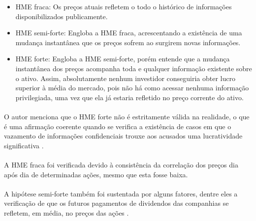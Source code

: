 \begin{itemize}
    \item HME fraca: Os preços atuais refletem o todo o histórico de informações disponibilizados publicamente.
    \item HME semi-forte: Engloba a HME fraca, acrescentando a existência de uma mudança instantânea que os preços sofrem ao surgirem novas informações.
    \item HME forte: Engloba a HME semi-forte, porém entende que a mudança instantânea dos preços acompanha toda e qualquer informação existente sobre o ativo. Assim, absolutamente nenhum investidor conseguiria obter lucro superior à média do mercado, pois não há como acessar nenhuma informação privilegiada, uma vez que ela já estaria refletido no preço corrente do ativo.
\end{itemize}

\paragraph{} O autor menciona que o HME forte não é estritamente válida na realidade, o que é uma afirmação coerente quando se verifica a existência de casos em que o vazamento de informações confidenciais trouxe aos acusados uma lucratividade significativa \cite{insider_trading}.

\paragraph{} A HME fraca foi verificada devido à consistência da correlação dos preços dia após dia de determinadas ações, mesmo que esta fosse baixa.

\paragraph{} A hipótese semi-forte também foi sustentada por alguns fatores, dentre eles a verificação de que os futuros pagamentos de dividendos das companhias se refletem, em média, no preços das ações \cite{fama1969adjustment}.

